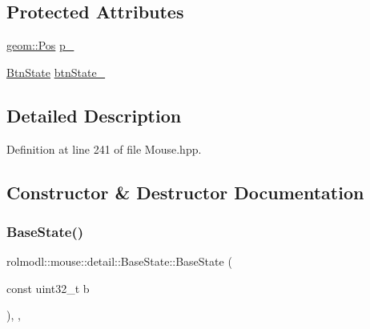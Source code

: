 \subsection*{Protected Attributes}
\begin{DoxyCompactItemize}
\item 
\mbox{\hyperlink{structrolmodl_1_1geom_1_1_pos}{geom\+::\+Pos}} \mbox{\hyperlink{classrolmodl_1_1rolmodl_1_1mouse_1_1btn_1_1detail_1_1_base_state_abf34f726271f596964afd6a46c3a3ba0}{p\+\_\+}}
\item 
\mbox{\hyperlink{structrolmodl_1_1rolmodl_1_1mouse_1_1btn_1_1_btn_state}{Btn\+State}} \mbox{\hyperlink{classrolmodl_1_1rolmodl_1_1mouse_1_1btn_1_1detail_1_1_base_state_aa8ce7e7fa32d84f4db1f2c2673867d71}{btn\+State\+\_\+}}
\end{DoxyCompactItemize}


\subsection{Detailed Description}


Definition at line 241 of file Mouse.\+hpp.



\subsection{Constructor \& Destructor Documentation}
\mbox{\label{classrolmodl_1_1rolmodl_1_1mouse_1_1btn_1_1detail_1_1_base_state_a36e882c50f0e17ea1472f06776f963b1}} 
\subsubsection{\texorpdfstring{BaseState()}{BaseState()}}
{\footnotesize\ttfamily rolmodl\+::mouse\+::detail\+::\+Base\+State\+::\+Base\+State (\begin{DoxyParamCaption}\item[{const uint32\+\_\+t}]{b }\end{DoxyParamCaption})\hspace{0.3cm}{\ttfamily [explicit]}, {\ttfamily [protected]}, {\ttfamily [noexcept]}}



